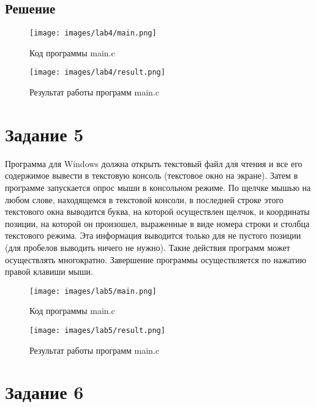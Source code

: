 \documentclass[14pt, a4paper]{article}
\begin{document}
    \subsection*{Решение}

    \begin{figure}[H]
        \centering
        \texttt{[image: images/lab4/main.png]}
        \caption{Код программы main.c}
    \end{figure}

    \begin{figure}[H]
        \centering
        \texttt{[image: images/lab4/result.png]}
        \caption{Результат работы программ main.c}
    \end{figure}

    \newpage

    \section*{Задание 5}

    Программа для Windows должна открыть текстовый файл для чтения и все его содержимое вывести в текстовую консоль (текстовое окно на экране). Затем в программе запускается опрос мыши в консольном режиме. По щелчке мышью на любом слове, находящемся в текстовой консоли, в последней строке этого текстового окна выводится буква, на которой осуществлен щелчок, и координаты позиции, на которой он произошел, выраженные в виде номера строки и столбца текстового режима. Эта информация выводится только для не пустого позиции (для пробелов выводить ничего не нужно). Такие действия программ может осуществлять многократно. Завершение программы осуществляется по нажатию правой клавиши мыши.

    \begin{figure}[H]
        \centering
        \texttt{[image: images/lab5/main.png]}
        \caption{Код программы main.c}
    \end{figure}

    \begin{figure}[H]
        \centering
        \texttt{[image: images/lab5/result.png]}
        \caption{Результат работы программ main.c}
    \end{figure}

    \newpage

    \section*{Задание 6}
\end{document}
